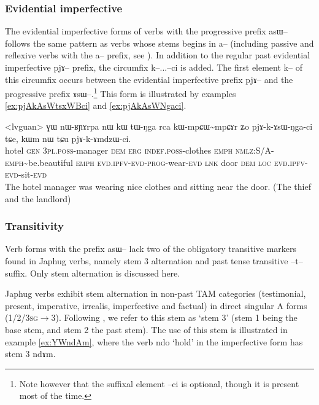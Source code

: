 \documentclass[oldfontcommands,oneside,a4paper,11pt]{article}
\newcommand{\ipa}[1]{{\phon \mbox{#1}}} %
\begin{document}
\subsubsection{Evidential imperfective}

The evidential imperfective forms of verbs with the progressive prefix \ipa{asɯ--} follows the same pattern as verbs whose stems begins in \ipa{a--} (including passive and reflexive verbs with the \ipa{a--} prefix, see \citealt{jacques07passif}). In addition to the regular past evidential imperfective \ipa{pjɤ--} prefix, the circumfix \ipa{k--}...\ipa{--ci} is added. The first element \ipa{k--} of this circumfix occurs between the evidential imperfective prefix \ipa{pjɤ--} and the progressive prefix \ipa{ɤsɯ--}.\footnote{Note however that the suffixal element \ipa{--ci} is optional, though it is present most of the time.} This form is illustrated by examples \ref{ex:pjAkAsWtsxWBci} and \ref{ex:pjAkAsWNgaci}.

\begin{exe}
\ex \label{ex:pjAkAsWNgaci}
\gll
<lvguan>	\ipa{ɣɯ} 	\ipa{nɯ-ʁɲɤrpa} 	\ipa{nɯ} 	\ipa{kɯ} 	\ipa{tɯ-ŋga} 	\ipa{rca} 	\ipa{kɯ-mpɕɯ\textasciitilde{}mpɕɤr} 	\ipa{ʑo} 	\ipa{pjɤ-k-ɤsɯ-ŋga-ci} 	\ipa{tɕe,} 	\ipa{kɯm} 	\ipa{nɯ} 	\ipa{tɕu} 	\ipa{pjɤ-k-ɤmdzɯ-ci.} 	\\
hotel \textsc{gen} \textsc{3pl.poss}-manager \textsc{dem} \textsc{erg} \textsc{indef.poss}-clothes \textsc{emph} \textsc{nmlz:S/A-emph}\textasciitilde{}be.beautiful \textsc{emph} \textsc{evd.ipfv-evd-prog}-wear-\textsc{evd} \textsc{lnk} door \textsc{dem} \textsc{loc} \textsc{evd.ipfv-evd}-sit-\textsc{evd}
\\
\glt The hotel manager was wearing nice clothes and sitting near the door. (The thief and the landlord)
\end{exe}

\subsubsection{Transitivity}

Verb forms with the prefix \ipa{asɯ--} lack two of the obligatory transitive markers found in Japhug verbs, namely stem 3 alternation and past tense transitive \ipa{--t--} suffix. Only stem alternation is discussed here.

Japhug verbs exhibit stem alternation in non-past TAM categories (testimonial, present, imperative, irrealis, imperfective and factual) in direct singular A forms (\textsc{1/2/3sg}$\rightarrow$3). Following \citet{jackson00puxi}, we refer to this stem as `stem 3' (stem 1 being the base stem, and stem 2 the past stem). The use of this stem is illustrated in example \ref{ex:YWndAm}, where the verb \ipa{ndo} `hold' in the imperfective form has stem 3 \ipa{ndɤm}.
\end{document}
